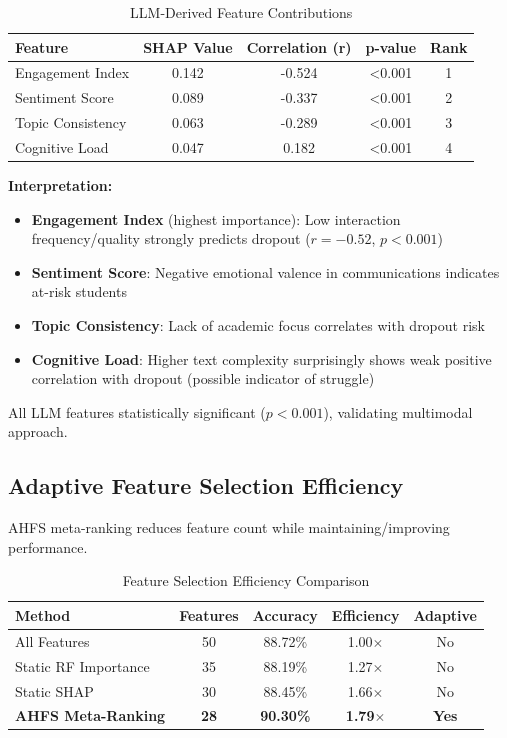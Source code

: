 \begin{table}[h]
\centering
\caption{LLM-Derived Feature Contributions}
\label{tab:llm_features}
\begin{tabular}{lcccc}
\toprule
\textbf{Feature} & \textbf{SHAP Value} & \textbf{Correlation (r)} & \textbf{p-value} & \textbf{Rank} \\
\midrule
Engagement Index & 0.142 & -0.524 & <0.001 & 1 \\
Sentiment Score & 0.089 & -0.337 & <0.001 & 2 \\
Topic Consistency & 0.063 & -0.289 & <0.001 & 3 \\
Cognitive Load & 0.047 & 0.182 & <0.001 & 4 \\
\bottomrule
\end{tabular}
\end{table}

\textbf{Interpretation:}
\begin{itemize}
\item \textbf{Engagement Index} (highest importance): Low interaction frequency/quality strongly predicts dropout ($r=-0.52$, $p<0.001$)
\item \textbf{Sentiment Score}: Negative emotional valence in communications indicates at-risk students
\item \textbf{Topic Consistency}: Lack of academic focus correlates with dropout risk
\item \textbf{Cognitive Load}: Higher text complexity surprisingly shows weak positive correlation with dropout (possible indicator of struggle)
\end{itemize}

All LLM features statistically significant ($p<0.001$), validating multimodal approach.

\subsection{Adaptive Feature Selection Efficiency}

AHFS meta-ranking reduces feature count while maintaining/improving performance.

\begin{table}[h]
\centering
\caption{Feature Selection Efficiency Comparison}
\label{tab:feature_efficiency}
\begin{tabular}{lcccc}
\toprule
\textbf{Method} & \textbf{Features} & \textbf{Accuracy} & \textbf{Efficiency} & \textbf{Adaptive} \\
\midrule
All Features & 50 & 88.72\% & 1.00$\times$ & No \\
Static RF Importance & 35 & 88.19\% & 1.27$\times$ & No \\
Static SHAP & 30 & 88.45\% & 1.66$\times$ & No \\
\textbf{AHFS Meta-Ranking} & \textbf{28} & \textbf{90.30\%} & \textbf{1.79$\times$} & \textbf{Yes} \\
\bottomrule
\end{tabular}
\end{table}


